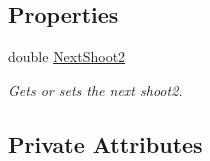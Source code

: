 \subsection*{Properties}
\begin{DoxyCompactItemize}
\item 
double \hyperlink{classXaria_1_1Enemies_1_1Boss2_ab3295a73b0cbd41b9ab33692c5fd9c97}{Next\+Shoot2}
\begin{DoxyCompactList}\small\item\em Gets or sets the next shoot2. \end{DoxyCompactList}\end{DoxyCompactItemize}
\subsection*{Private Attributes}
